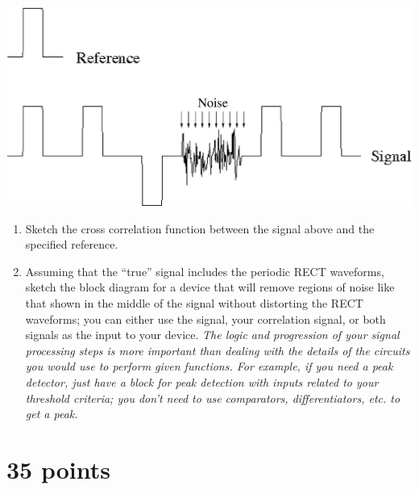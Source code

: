 \documentclass[12pt]{article}
\begin{document}
\begin{center}
\includegraphics[width=0.5\linewidth]{corrfig.eps}
\end{center}

\begin{enumerate}
\item Sketch the cross correlation function between the signal above and the
specified reference.
\item Assuming that the ``true'' signal includes the periodic RECT waveforms,
sketch the block diagram for a device that will remove regions of noise like
that shown in the middle of the signal without distorting the RECT waveforms;
you can either use the signal, your correlation signal, or both signals as the
input to your device.  \emph{The logic and progression of your signal
processing steps is more important than dealing with the details of the
circuits you would use to perform given functions.  For example, if you need a
peak detector, just have a block for peak detection with inputs related to your
threshold criteria; you don't need to use comparators, differentiators, etc. to
get a peak.}
\end{enumerate}

\clearpage



\clearpage



\section{35 points}
\end{document}
